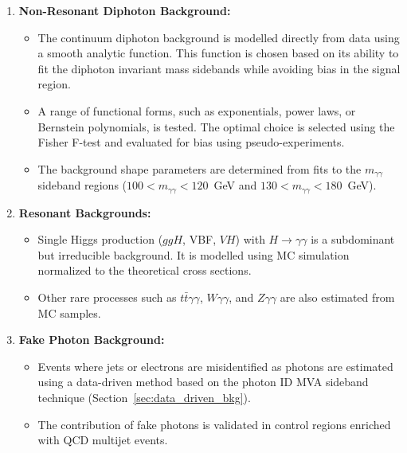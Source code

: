 \begin{enumerate}
    \item \textbf{Non-Resonant Diphoton Background:}
    \begin{itemize}
        \item The continuum diphoton background is modelled directly from data using a smooth analytic function. This function is chosen based on its ability to fit the diphoton invariant mass sidebands while avoiding bias in the signal region.
        \item A range of functional forms, such as exponentials, power laws, or Bernstein polynomials, is tested. The optimal choice is selected using the Fisher F-test and evaluated for bias using pseudo-experiments.
        \item The background shape parameters are determined from fits to the \(m_{\gamma\gamma}\) sideband regions (\(100 < m_{\gamma\gamma} < 120\)~GeV and \(130 < m_{\gamma\gamma} < 180\)~GeV).
    \end{itemize}

    \item \textbf{Resonant Backgrounds:}
    \begin{itemize}
        \item Single Higgs production (\(ggH\), VBF, \(VH\)) with \(H \to \gamma\gamma\) is a subdominant but irreducible background. It is modelled using MC simulation normalized to the theoretical cross sections.
        \item Other rare processes such as \(t\bar{t}\gamma\gamma\), \(W\gamma\gamma\), and \(Z\gamma\gamma\) are also estimated from MC samples.
    \end{itemize}

    \item \textbf{Fake Photon Background:}
    \begin{itemize}
        \item Events where jets or electrons are misidentified as photons are estimated using a data-driven method based on the photon ID MVA sideband technique (Section~\ref{sec:data_driven_bkg}).
        \item The contribution of fake photons is validated in control regions enriched with QCD multijet events.
    \end{itemize}
\end{enumerate}

